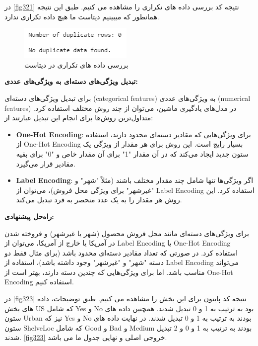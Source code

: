 \documentclass{article}
\begin{document}
در \autoref{fig321} نتیجه کد بررسی داده های تکراری را مشاهده می کنیم. طبق این نتیجه همانطور که میبینیم دیتاست ما هیچ داده تکراری ندارد.


\begin{figure}[h!]
    \centering
    \includegraphics[width=0.6\linewidth]{q3_p22.png}
    \caption{بررسی داده های تکراری در دیتاست}
    \label{fig322}
\end{figure}




\textbf{تبدیل ویژگی‌های دسته‌ای به ویژگی‌های عددی:
}

برای تبدیل ویژگی‌های دسته‌ای (categorical features) به ویژگی‌های عددی (numerical features) در مدل‌های یادگیری ماشین، می‌توان از چند روش مختلف استفاده کرد. متداول‌ترین روش‌ها برای انجام این تبدیل عبارتند از:

\begin{itemize}
    \item \textbf{One-Hot Encoding}: برای ویژگی‌هایی که مقادیر دسته‌ای محدود دارند، استفاده از One-Hot Encoding بسیار رایج است. این روش برای هر مقدار از ویژگی یک ستون جدید ایجاد می‌کند که در آن مقدار "1" برای آن مقدار خاص و "0" برای بقیه مقادیر قرار می‌گیرد.
    
    \item \textbf{Label Encoding}: اگر ویژگی‌ها تنها شامل چند مقدار مختلف باشند (مثلاً "شهر" و "غیرشهر" برای ویژگی محل فروش)، می‌توان از Label Encoding استفاده کرد. این روش هر مقدار را به یک عدد منحصر به فرد تبدیل می‌کند.
\end{itemize}

\textbf{راه‌حل پیشنهادی:
}

برای ویژگی‌های دسته‌ای مانند محل فروش محصول (شهر یا غیرشهر) و فروخته شدن در آمریکا یا خارج از آمریکا، می‌توان از Label Encoding یا One-Hot Encoding استفاده کرد. در صورتی که تعداد مقادیر دسته‌ای محدود باشد (برای مثال فقط دو دسته "شهر" و "غیرشهر" وجود داشته باشد)، استفاده از Label Encoding می‌تواند مناسب باشد. اما برای ویژگی‌هایی که چندین دسته دارند، بهتر است از One-Hot Encoding استفاده کنیم.


در \autoref{fig323} نتیجه کد پایتون برای این بخش را مشاهده می کنیم. طبق توضیحات، داده های بخش US که شامل Yes و No بود به ترتیب به 1 و 0 تبدیل شدند. همچنین داده های ستون Urban نیز که Yes و No بودند به ترتیب به 1 و 0 تبدیل شدند. در نهایت داده های ستون ShelveLoc که شامل Good و Bad و Medium بودند به ترتیب به 1 و 0 و 2 تبدیل شدند. \autoref{fig323} خروجی اصلی و نهایی جدول ما می باشد.
\end{document}
